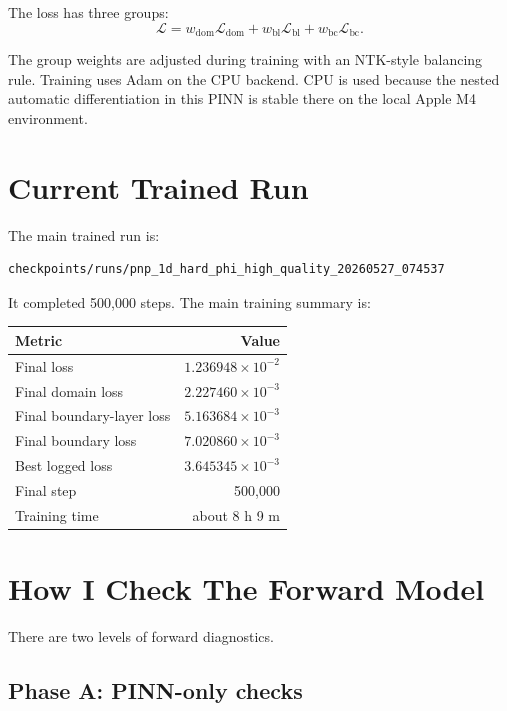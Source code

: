 \documentclass[11pt]{article}
\begin{document}
The loss has three groups:
\[
  \mathcal{L}
  =
  w_{\mathrm{dom}}\mathcal{L}_{\mathrm{dom}}
  +
  w_{\mathrm{bl}}\mathcal{L}_{\mathrm{bl}}
  +
  w_{\mathrm{bc}}\mathcal{L}_{\mathrm{bc}}.
\]

The group weights are adjusted during training with an NTK-style balancing rule.
Training uses Adam on the CPU backend. CPU is used because the nested automatic
differentiation in this PINN is stable there on the local Apple M4 environment.

\section*{Current Trained Run}

The main trained run is:

\begin{verbatim}
checkpoints/runs/pnp_1d_hard_phi_high_quality_20260527_074537
\end{verbatim}

It completed 500,000 steps. The main training summary is:

\begin{center}
\begin{tabular}{lr}
\toprule
Metric & Value \\
\midrule
Final loss & $1.236948\times 10^{-2}$ \\
Final domain loss & $2.227460\times 10^{-3}$ \\
Final boundary-layer loss & $5.163684\times 10^{-3}$ \\
Final boundary loss & $7.020860\times 10^{-3}$ \\
Best logged loss & $3.645345\times 10^{-3}$ \\
Final step & 500,000 \\
Training time & about 8 h 9 m \\
\bottomrule
\end{tabular}
\end{center}

\section*{How I Check The Forward Model}

There are two levels of forward diagnostics.

\subsection*{Phase A: PINN-only checks}
\end{document}
